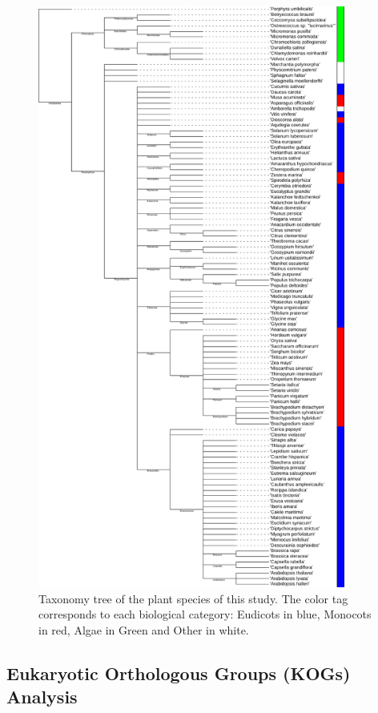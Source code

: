 \begin{figure}[htp]
\centering
\includegraphics[width=0.9\textwidth]{figures/Taxa}
\caption{Taxonomy tree of the plant species of this study. 
The color tag corresponds to each biological category: 
Eudicots in blue, Monocots in red, Algae in Green and 
Other in white.
}
\label{fig:taxa}
\end{figure}


\subsection{Eukaryotic Orthologous Groups (KOGs) Analysis}
\label{sec:method.kog}


